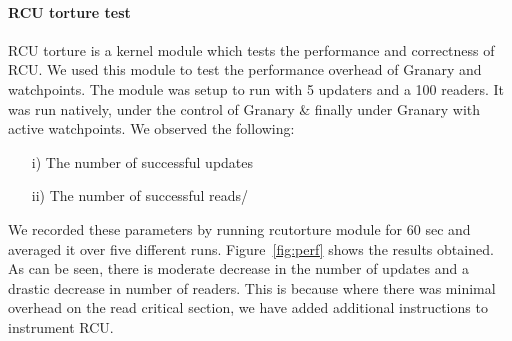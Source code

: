 \paragraph{RCU torture test} RCU torture is a kernel module which tests the
performance and correctness of RCU. We used this module to test the
performance overhead of Granary and watchpoints. The module was setup to
run with 5 updaters and a 100 readers. It was run
natively, under the control of Granary \& finally under
Granary with active watchpoints. We observed the following:
\begin{enumerate}
	\item[i)] The number of successful updates
	\item[ii)] The number of successful reads/
\end{enumerate}
We recorded these parameters by running rcutorture module for 60 sec and
averaged it over five different runs. Figure~\ref{fig:perf} shows the
results obtained. As can be seen, there is moderate decrease in the number
of updates and a drastic decrease in number of readers. This is because
where there was minimal overhead on the read critical section, we have
added additional instructions to instrument RCU.




